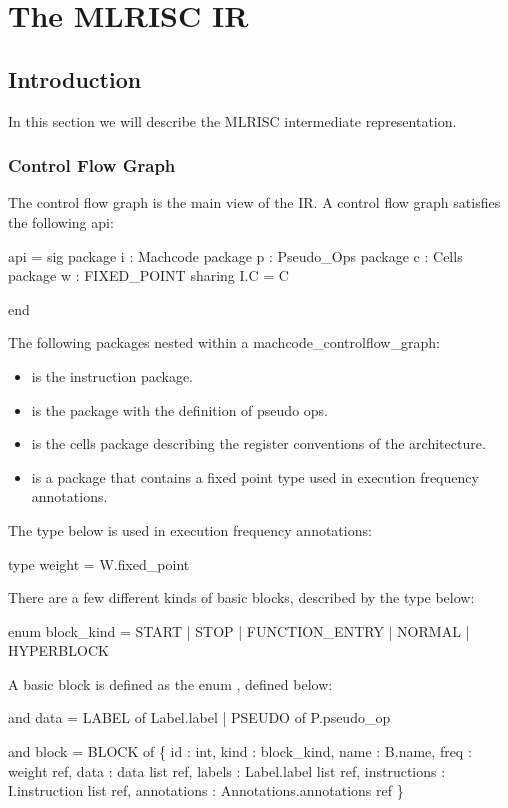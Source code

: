 \section{The MLRISC IR}
\subsection{Introduction}

In this section we will describe the MLRISC intermediate representation.

\subsubsection{Control Flow Graph}
The control flow graph is the main view of the IR.  
A control flow graph satisfies the following api:
\begin{SML}
 api  = sig
   package i : Machcode
   package p : Pseudo_Ops
   package c : Cells
   package w : FIXED_POINT 
      sharing I.C = C
   
 end
\end{SML}

The following packages nested within a machcode_controlflow_graph:
\begin{itemize}
   \item {} is the instruction package.
   \item {} is the package with the definition
of pseudo ops.
   \item {} is the cells package describing the
register conventions of the architecture.
   \item {} is a package that contains
a fixed point type used in execution frequency annotations.
\end{itemize}

The type  below is used in execution frequency annotations:
\begin{SML}
   type weight = W.fixed_point
\end{SML}

There are a few different kinds of basic blocks, described
by the type  below:
\begin{SML}
   enum block_kind = 
       START          
     | STOP          
     | FUNCTION_ENTRY
     | NORMAL        
     | HYPERBLOCK   
\end{SML}

A basic block is defined as the enum , defined below:
\begin{SML}
   and data = LABEL  of Label.label
            | PSEUDO of P.pseudo_op

   and block = 
      BLOCK of
      \{  id          : int,                      
         kind        : block_kind,                 
         name        : B.name,                    
         freq        : weight ref,                
         data        : data list ref,             
         labels      : Label.label list ref,     
         instructions       : I.instruction list ref,     
         annotations : Annotations.annotations ref 
      \}
\end{SML}

